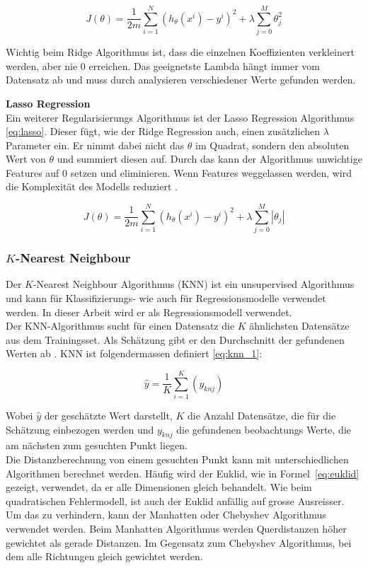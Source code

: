 \begin{equation}
\label{eq:ridge}
J(\theta) = \frac{1}{2m} \sum_{i=1}^{N} (h_\theta(x^i) - y^i)^2 + \lambda \sum_{j=0}^{M} \theta_{j}^{2}
\end{equation}

Wichtig beim Ridge Algorithmus ist, dass die einzelnen Koeffizienten verkleinert werden, aber nie 0 erreichen. Das geeignetste Lambda hängt immer vom Datensatz ab und muss durch analysieren verschiedener Werte gefunden werden.

\textbf{Lasso Regression}\\
Ein weiterer Regularisierungs Algorithmus ist der Lasso Regression Algorithmus \eqref{eq:lasso}. Dieser fügt, wie der Ridge Regression auch, einen zusätzlichen $\lambda$ Parameter ein. Er nimmt dabei nicht das $\theta$ im Quadrat, sondern den absoluten Wert von $\theta$ und summiert diesen auf. Durch das kann der Algorithmus unwichtige Features auf 0 setzen und eliminieren. Wenn Features weggelassen werden, wird die Komplexität des Modells reduziert \cite{lasso}.

\begin{equation}\label{eq:lasso}
J(\theta) = \frac{1}{2m} \sum_{i=1}^{N} (h_\theta(x^i) - y^i)^2 + \lambda \sum_{j=0}^{M} |\theta_j|
\end{equation}

\subsubsection{$K$-Nearest Neighbour}
Der $K$-Nearest Neighbour Algorithmus (KNN) ist ein unsupervised Algorithmus und kann für Klassifizierungs- wie auch für Regressionsmodelle verwendet werden. In dieser Arbeit wird er als Regressionsmodell verwendet.\\
Der KNN-Algorithmus sucht für einen Datensatz die $K$ ähnlichsten Datensätze aus dem Trainingsset. Als Schätzung gibt er den Durchschnitt der gefundenen Werten ab \cite{knn_1}. KNN ist folgendermassen definiert \eqref{eq:knn_1}:

\begin{equation}\label{eq:knn_1}
\hat{y} = \frac{1}{K} \sum_{i=1}^{K} (y_{knj})
\end{equation}

Wobei $\hat{y}$ der geschätzte Wert darstellt, $K$ die Anzahl Datensätze, die für die Schätzung einbezogen werden und $y_{knj}$ die gefundenen beobachtungs Werte, die am nächsten zum gesuchten Punkt liegen.\\
Die Distanzberechnung von einem gesuchten Punkt kann mit unterschiedlichen Algorithmen berechnet werden. Häufig wird der Euklid, wie in Formel~\eqref{eq:euklid} gezeigt, verwendet, da er alle Dimensionen gleich behandelt. Wie beim quadratischen Fehlermodell, ist auch der Euklid anfällig auf grosse Ausreisser. Um das zu verhindern, kann der Manhatten oder Chebyshev Algorithmus verwendet werden. Beim Manhatten Algorithmus werden Querdistanzen höher gewichtet als gerade Distanzen. Im Gegensatz zum Chebyshev Algorithmus, bei dem alle Richtungen gleich gewichtet werden.

